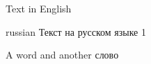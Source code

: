 \documentclass{article}
\begin{document}
Text in English

\begin{otherlanguage*}{russian}
Текст на русском языке  1
\end{otherlanguage*}

A word and another \foreignlanguage{russian}{слово}
\end{document}
